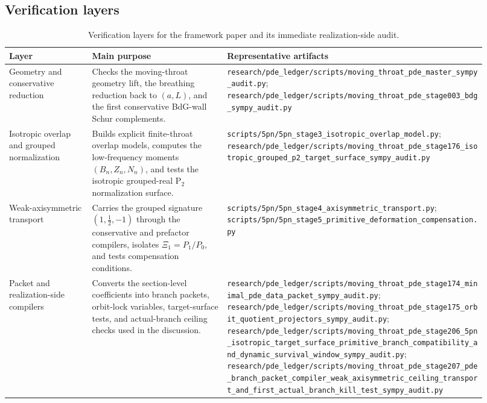 \documentclass[11pt]{article}
\theoremstyle{definition}
\newcommand{\Ptwo}{\ensuremath{\mathrm{P}_2}}
\newcommand{\XiOne}{\ensuremath{\Xi_1}}
\begin{document}
\subsection{Verification layers}

\begin{table}[t]
\centering
\small
\renewcommand{\arraystretch}{1.15}
\begin{tabular}{@{}L{0.16\linewidth}L{0.26\linewidth}L{0.50\linewidth}@{}}
\toprule
Layer & Main purpose & Representative artifacts \\
\midrule
Geometry and conservative reduction & Checks the moving-throat geometry lift, the breathing reduction back to $(a,L)$, and the first conservative BdG-wall Schur complements. & \nolinkurl{research/pde_ledger/scripts/moving_throat_pde_master_sympy_audit.py}; \nolinkurl{research/pde_ledger/scripts/moving_throat_pde_stage003_bdg_sympy_audit.py} \\

Isotropic overlap and grouped normalization & Builds explicit finite-throat overlap models, computes the low-frequency moments $(B_n,Z_n,N_n)$, and tests the isotropic grouped-real $\Ptwo$ normalization surface. & \nolinkurl{scripts/5pn/5pn_stage3_isotropic_overlap_model.py}; \nolinkurl{research/pde_ledger/scripts/moving_throat_pde_stage176_isotropic_grouped_p2_target_surface_sympy_audit.py} \\

Weak-axisymmetric transport & Carries the grouped signature $(1,\tfrac12,-1)$ through the conservative and prefactor compilers, isolates $\XiOne=P_1/P_0$, and tests compensation conditions. & \nolinkurl{scripts/5pn/5pn_stage4_axisymmetric_transport.py}; \nolinkurl{scripts/5pn/5pn_stage5_primitive_deformation_compensation.py} \\

Packet and realization-side compilers & Converts the section-level coefficients into branch packets, orbit-lock variables, target-surface tests, and actual-branch ceiling checks used in the discussion. & \nolinkurl{research/pde_ledger/scripts/moving_throat_pde_stage174_minimal_pde_data_packet_sympy_audit.py}; \nolinkurl{research/pde_ledger/scripts/moving_throat_pde_stage175_orbit_quotient_projectors_sympy_audit.py}; \nolinkurl{research/pde_ledger/scripts/moving_throat_pde_stage206_5pn_isotropic_target_surface_primitive_branch_compatibility_and_dynamic_survival_window_sympy_audit.py}; \nolinkurl{research/pde_ledger/scripts/moving_throat_pde_stage207_pde_branch_packet_compiler_weak_axisymmetric_ceiling_transport_and_first_actual_branch_kill_test_sympy_audit.py} \\
\bottomrule
\end{tabular}
\caption{Verification layers for the framework paper and its immediate realization-side audit.}
\label{tab:verification-map}
\end{table}
\end{document}
